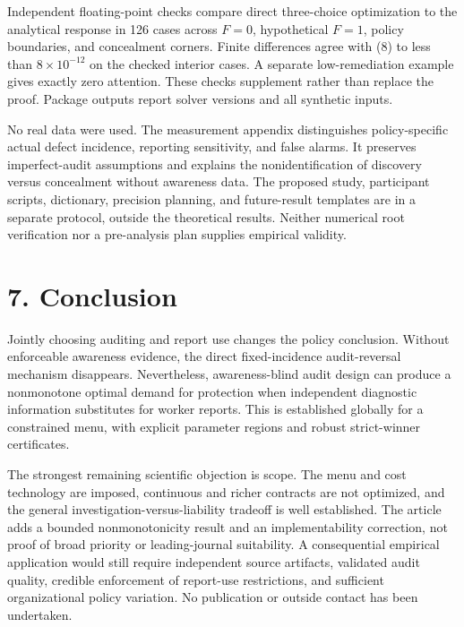\documentclass[
  11pt,
]{article}
\begin{document}
Independent floating-point checks compare direct three-choice
optimization to the analytical response in 126 cases across \(F=0\),
hypothetical \(F=1\), policy boundaries, and concealment corners. Finite
differences agree with (8) to less than \(8\times10^{-12}\) on the
checked interior cases. A separate low-remediation example gives exactly
zero attention. These checks supplement rather than replace the proof.
Package outputs report solver versions and all synthetic inputs.

No real data were used. The measurement appendix distinguishes
policy-specific actual defect incidence, reporting sensitivity, and
false alarms. It preserves imperfect-audit assumptions and explains the
nonidentification of discovery versus concealment without awareness
data. The proposed study, participant scripts, dictionary, precision
planning, and future-result templates are in a separate protocol,
outside the theoretical results. Neither numerical root verification nor
a pre-analysis plan supplies empirical validity.

\section{7. Conclusion}\label{conclusion-and-remaining-objections}

Jointly choosing auditing and report use changes the policy conclusion.
Without enforceable awareness evidence, the direct fixed-incidence
audit-reversal mechanism disappears. Nevertheless, awareness-blind audit
design can produce a nonmonotone optimal demand for protection when
independent diagnostic information substitutes for worker reports. This
is established globally for a constrained menu, with explicit parameter
regions and robust strict-winner certificates.

The strongest remaining scientific objection is scope. The menu and cost
technology are imposed, continuous and richer contracts are not
optimized, and the general investigation-versus-liability tradeoff is
well established. The article adds a bounded nonmonotonicity result and
an implementability correction, not proof of broad priority or
leading-journal suitability. A consequential empirical application would
still require independent source artifacts, validated audit quality,
credible enforcement of report-use restrictions, and sufficient
organizational policy variation. No publication or outside contact has
been undertaken.
\end{document}
